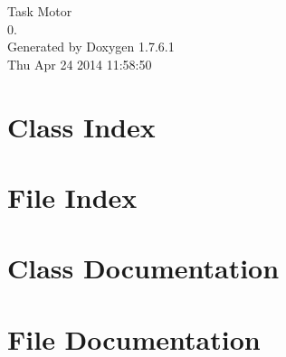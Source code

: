 \documentclass[letterpaper]{book}
\begin{document}
\hypersetup{pageanchor=false,citecolor=blue}
\begin{titlepage}
\vspace*{7cm}
\begin{center}
{\Large \-Task \-Motor \\[1ex]\large 0. }\\
\vspace*{1cm}
{\large \-Generated by Doxygen 1.7.6.1}\\
\vspace*{0.5cm}
{\small Thu Apr 24 2014 11:58:50}\\
\end{center}
\end{titlepage}
\clearemptydoublepage
{}
\tableofcontents
\clearemptydoublepage
{}
\hypersetup{pageanchor=true,citecolor=blue}
\chapter{\-Class \-Index}

\chapter{\-File \-Index}

\chapter{\-Class \-Documentation}






\chapter{\-File \-Documentation}
















\printindex
\end{document}
